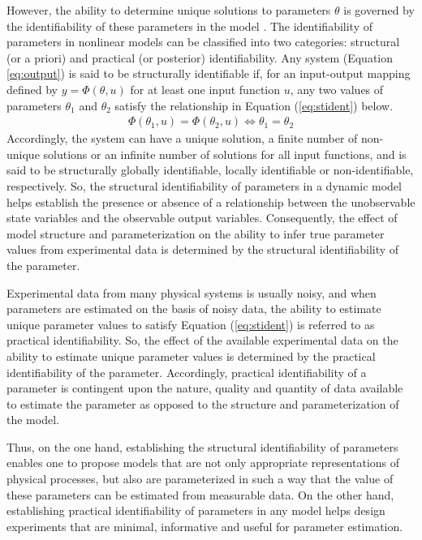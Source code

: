 \documentclass[10pt]{article}
\begin{document}
However, the ability to determine unique solutions to parameters $\theta$ is governed by the identifiability of these parameters in the model \parencite{McLean2012}. The identifiability of parameters in nonlinear models can be classified into two categories: structural (or a priori) and practical (or posterior) identifiability. 	
Any system (Equation \ref{eq:output}) is said to be structurally identifiable if, for an input-output mapping defined by $y = \Phi(\theta,u)$ for at least one input function $u$, any two values of parameters $\theta_1$ and $\theta_2$ satisfy the relationship in Equation (\ref{eq:stident}) below.
\begin{align}\label{eq:stident}
\Phi(\theta_1,u) = \Phi(\theta_2,u) \iff \theta_1 = \theta_2
\end{align}
Accordingly, the system can have a unique solution, a finite number of non-unique solutions or an infinite number of solutions for all input functions, and is said to be structurally globally identifiable, locally identifiable or non-identifiable, respectively. So, the structural identifiability of parameters in a dynamic model helps establish the presence or absence of a relationship between the unobservable state variables and the observable output variables. Consequently, the effect of model structure and parameterization on the ability to infer true parameter values from experimental data is determined by the structural identifiability of the parameter. 

Experimental data from many physical systems is usually noisy, and when parameters are estimated on the basis of noisy data, the ability to estimate unique parameter values to satisfy Equation (\ref{eq:stident}) is referred to as practical identifiability. So, the effect of the available experimental data on the ability to estimate unique parameter values is determined by the practical identifiability of the parameter. Accordingly, practical identifiability of a parameter is contingent upon the nature, quality and quantity of data available to estimate the parameter as opposed to the structure and parameterization of the model. 

Thus, on the one hand, establishing the structural identifiability of parameters enables one to propose models that are not only appropriate representations of physical processes, but also are parameterized in such a way that the value of these parameters can be estimated from measurable data. On the other hand, establishing practical identifiability of parameters in any model helps design experiments that are minimal, informative and useful for parameter estimation.
\end{document}
